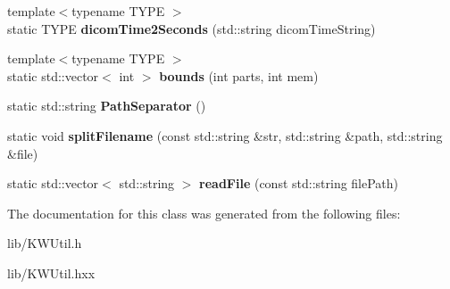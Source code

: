 \begin{DoxyCompactItemize}
\item 
\mbox{\label{class_k_w_util_a21813a6377e55fa15c70f64afb2feb51}} 
{\footnotesize template$<$typename T\+Y\+PE $>$ }\\static T\+Y\+PE {\bfseries dicom\+Time2\+Seconds} (std\+::string dicom\+Time\+String)
\item 
\mbox{\label{class_k_w_util_a498350d10204849240a945ea682ecc98}} 
{\footnotesize template$<$typename T\+Y\+PE $>$ }\\static std\+::vector$<$ int $>$ {\bfseries bounds} (int parts, int mem)
\item 
\mbox{\label{class_k_w_util_a19d7a4b4320a3b9d8ff06e4d296e2893}} 
static std\+::string {\bfseries Path\+Separator} ()
\item 
\mbox{\label{class_k_w_util_afe6ad66b5fe06a8b42918634076ab056}} 
static void {\bfseries split\+Filename} (const std\+::string \&str, std\+::string \&path, std\+::string \&file)
\item 
\mbox{\label{class_k_w_util_a70a639cebc8982645a9ba44f73b93d85}} 
static std\+::vector$<$ std\+::string $>$ {\bfseries read\+File} (const std\+::string file\+Path)
\end{DoxyCompactItemize}


The documentation for this class was generated from the following files\+:\begin{DoxyCompactItemize}
\item 
lib/K\+W\+Util.\+h\item 
lib/K\+W\+Util.\+hxx\end{DoxyCompactItemize}

